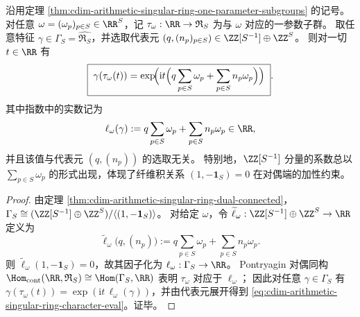 \begin{proposition}[素频率和约束下的特征评价公式]\label{prop:cdim-arithmetic-singular-ring-prime-frequency-character-eval}
沿用定理 \ref{thm:cdim-arithmetic-singular-ring-one-parameter-subgroups} 的记号。
对任意 \(\omega=(\omega_p)_{p\in S}\in\RR^S\)，记 \(\tau_{\omega}:\RR\to\mathfrak{R}_S\) 为与 \(\omega\) 对应的一参数子群。
取任意特征 \(\gamma\in\Gamma_S=\widehat{\mathfrak{R}_S}\)，并选取代表元 \((q,(n_p)_{p\in S})\in\ZZ[S^{-1}]\oplus\ZZ^{S}\)。
则对一切 \(t\in\RR\) 有
\begin{equation}\label{eq:cdim-arithmetic-singular-ring-character-eval}
\boxed{\;
\gamma(\tau_{\omega}(t))
=
\exp\!\Bigl(\mathrm{i}t\Bigl(q\sum_{p\in S}\omega_p+\sum_{p\in S}n_p\omega_p\Bigr)\Bigr)\; }.
\end{equation}
其中指数中的实数记为
\[
\ell_{\omega}(\gamma):=q\sum_{p\in S}\omega_p+\sum_{p\in S}n_p\omega_p\in\RR,
\]
并且该值与代表元 \((q,(n_p))\) 的选取无关。
特别地，\(\ZZ[S^{-1}]\) 分量的系数总以 \(\sum_{p\in S}\omega_p\) 的形式出现，体现了纤维积关系 \((1,-\mathbf 1_S)=0\) 在对偶端的加性约束。
\end{proposition}
\begin{proof}
由定理 \ref{thm:cdim-arithmetic-singular-ring-dual-connected}，\(\Gamma_S\cong (\ZZ[S^{-1}]\oplus\ZZ^{S})/\langle(1,-\mathbf{1}_S)\rangle\)。
对给定 \(\omega\)，令 \(\widetilde\ell_{\omega}:\ZZ[S^{-1}]\oplus\ZZ^{S}\to\RR\) 定义为
\[
\widetilde\ell_{\omega}\bigl(q,(n_p)\bigr):=q\sum_{p\in S}\omega_p+\sum_{p\in S}n_p\omega_p.
\]
则 \(\widetilde\ell_{\omega}(1,-\mathbf 1_S)=0\)，故其因子化为 \(\ell_{\omega}:\Gamma_S\to\RR\)。
Pontryagin 对偶同构 \(\Hom_{\mathrm{cont}}(\RR,\mathfrak{R}_S)\cong\Hom(\Gamma_S,\RR)\) 表明 \(\tau_{\omega}\) 对应于 \(\ell_{\omega}\)；
因此对任意 \(\gamma\in\Gamma_S\) 有 \(\gamma(\tau_{\omega}(t))=\exp(\mathrm{i}t\,\ell_{\omega}(\gamma))\)，并由代表元展开得到 \eqref{eq:cdim-arithmetic-singular-ring-character-eval}。证毕。
\end{proof}

